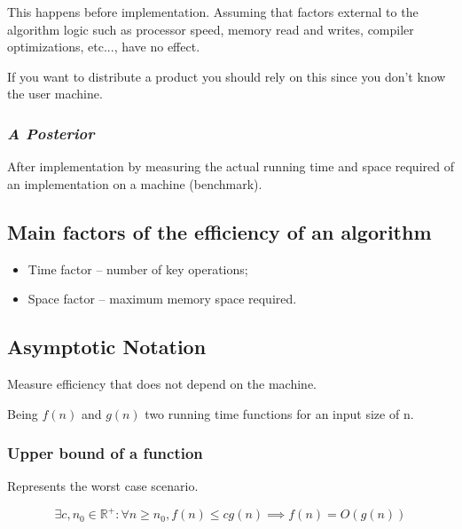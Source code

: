 \documentclass[a4paper,12pt]{article}
\theoremstyle{mytheoremstyle}
\theoremstyle{mytheoremstyle}
\theoremstyle{myproblemstyle}
\begin{document}
    This happens before implementation. Assuming that factors external to the
    algorithm logic such as processor speed, memory read and writes, compiler
    optimizations, etc..., have no effect.

    If you want to distribute a product you should rely on this since you don't
    know the user machine.

    \subsubsection{\textit{A Posterior}}

    After implementation by measuring the actual running time and space
    required of an implementation on a machine (benchmark).

    \subsection{Main factors of the efficiency of an algorithm}

    \begin{itemize}
        \item Time factor -- number of key operations;
        \item Space factor -- maximum memory space required.
    \end{itemize}

    \subsection{Asymptotic Notation}\label{sec:asymptotic}

    Measure efficiency that does not depend on the machine.

    Being $ f \left( n \right) $ and $ g \left( n \right) $ two running time
    functions for an input size of n.

    \subsubsection{Upper bound of a function}

    Represents the worst case scenario.

    \begin{definition}[Big $ O $]
        \begin{displaymath}
            \exists c, n_{0} \in \mathbb{R}^{+}: \forall n \ge n_{0}, f \left( n \right) \le c g \left( n \right) \implies f \left( n \right) = O \left( g \left( n \right) \right)
        \end{displaymath}
        \label{eq:big_oh}
    \end{definition}
\end{document}
